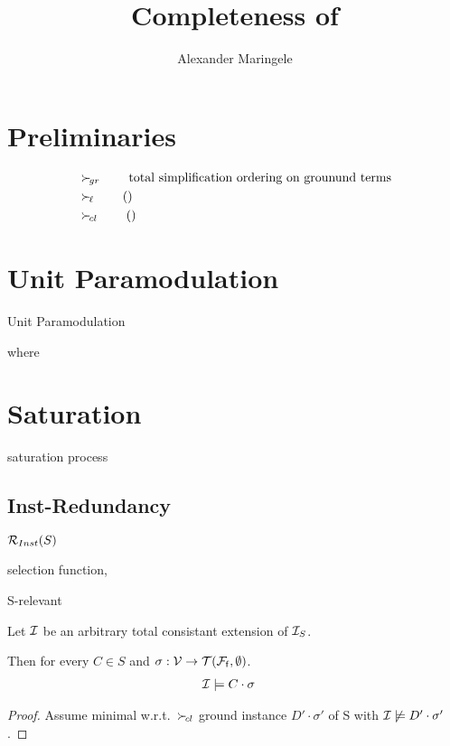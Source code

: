 \documentclass[%
handout,
]{beamer}
\title[Completeness]{Completeness of }
\author[{A$\ell$M}]{%
	Alexander Maringele
}
\institute[UIBK]{%
	{alexander.maringele@gmail.com}
}
\begin{document}
\titleframe

\begin{frame}
    \nocite{GK2004csl}
    
    
\end{frame}


\section{Preliminaries}
\begin{frame}
    \begin{align*}
        &\mathrel\succ_{\!gr} \tag*{total simplification ordering on grounund terms}\\
        &\mathrel\succ_{\!\ell} \tag{}\\
        &\mathrel\succ_{\!cl} \tag{}
    \end{align*}
\end{frame}

\section{Unit Paramodulation}
\begin{frame}{Unit Paramodulation}





    \begin{definition}
    
    where
    
    \end{definition}
\end{frame}

\section{Saturation}
\begin{frame}
    saturation process
\end{frame}

\subsection{Inst-Redundancy}

\begin{frame}
    $\mathcal{R}_{Inst}(S)$

    selection function,

    S-relevant
\end{frame}

\begin{frame}
    \begin{Lemma}
        Let $\mathcal{I}$ be an arbitrary total consistant extension of $\mathcal{I}_S$.

        Then for every $C\in S$ and $\sigma:\mathcal{V}\to{\mathcal{T}(\mathcal{F}_{\mathsf{f}},\emptyset)}$.
        \begin{align*}
            \mathcal{I} &\models C\cdot\sigma
        \end{align*}
    \end{Lemma}

    \begin{proof}
        Assume minimal w.r.t.~$\mathrel\succ_{\!cl}$
        ground instance $D'\cdot\sigma'$ of S with $\mathcal{I}\not\models D'\cdot\sigma'$.
    \end{proof}
\end{frame}
\end{document}
